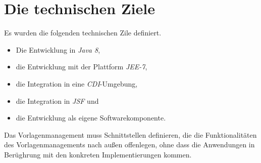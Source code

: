 \section{Die technischen Ziele}
\label{sec:technical-goals}
Es wurden die folgenden technischen Zile definiert.
\begin{itemize}
	\item Die Entwicklung in \emph{Java 8},
	\item die Entwicklung mit der Plattform \emph{JEE-7},
	\item die Integration in eine \emph{CDI}-Umgebung,
	\item die Integration in \emph{JSF} und
	\item die Entwicklung als eigene Softwarekomponente.
\end{itemize}
Das Vorlagenmanagement muss Schnittstellen definieren, die die Funktionalitäten des Vorlagenmanagements nach außen offenlegen, ohne dass die Anwendungen in Berüghrung mit den konkreten Implementierungen kommen.